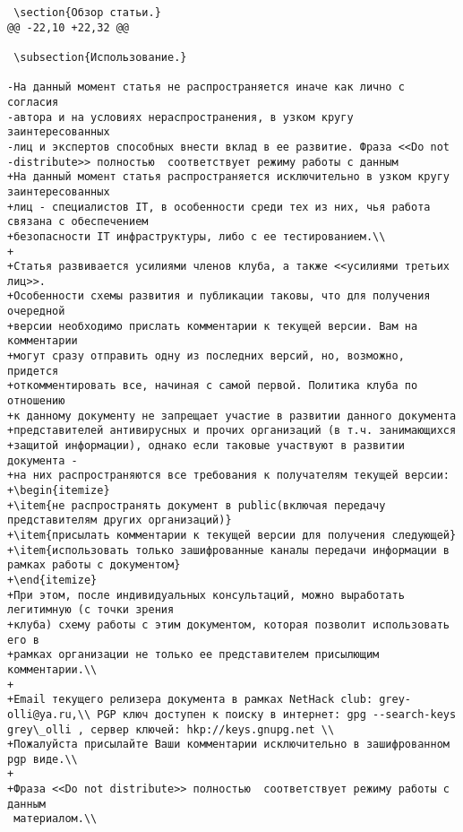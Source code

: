 \begin{verbatim}
 \section{Обзор статьи.}
@@ -22,10 +22,32 @@

 \subsection{Использование.}

-На данный момент статья не распространяется иначе как лично с согласия
-автора и на условиях нераспространения, в узком кругу заинтересованных
-лиц и экспертов способных внести вклад в ее развитие. Фраза <<Do not
-distribute>> полностью  соответствует режиму работы с данным
+На данный момент статья распространяется исключительно в узком кругу заинтересованных
+лиц - специалистов IT, в особенности среди тех из них, чья работа связана с обеспечением
+безопасности IT инфраструктуры, либо с ее тестированием.\\
+
+Статья развивается усилиями членов клуба, а также <<усилиями третьих лиц>>.
+Особенности схемы развития и публикации таковы, что для получения очередной
+версии необходимо прислать комментарии к текущей версии. Вам на комментарии
+могут сразу отправить одну из последних версий, но, возможно, придется
+откомментировать все, начиная с самой первой. Политика клуба по отношению
+к данному документу не запрещает участие в развитии данного документа
+представителей антивирусных и прочих организаций (в т.ч. занимающихся
+защитой информации), однако если таковые участвуют в развитии документа -
+на них распространяются все требования к получателям текущей версии:
+\begin{itemize}
+\item{не распространять документ в public(включая передачу представителям других организаций)}
+\item{присылать комментарии к текущей версии для получения следующей}
+\item{использовать только зашифрованные каналы передачи информации в рамках работы с документом}
+\end{itemize}
+При этом, после индивидуальных консультаций, можно выработать легитимную (с точки зрения
+клуба) схему работы с этим документом, которая позволит использовать его в
+рамках организации не только ее представителем присылющим комментарии.\\
+
+Email текущего релизера документа в рамках NetHack club: grey-olli@ya.ru,\\ PGP ключ доступен к поиску в интернет: gpg --search-keys grey\_olli , сервер ключей: hkp://keys.gnupg.net \\
+Пожалуйста присылайте Ваши комментарии исключительно в зашифрованном pgp виде.\\
+
+Фраза <<Do not distribute>> полностью  соответствует режиму работы с данным
 материалом.\\


\end{verbatim}

